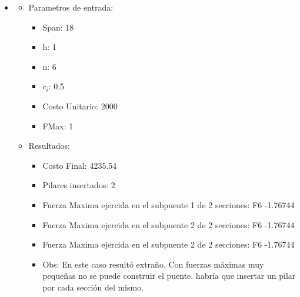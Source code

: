 \begin{itemize}
\begin{itemize}
\begin{itemize}
	  \end{itemize}
      \end{itemize}
\item
  \begin{itemize}
    \item Parametros de entrada:
	  \begin{itemize}
	    \item Span: 18
	    \item h: 1
	    \item n: 6
	    \item $c_i$: 0.5
	    \item Costo Unitario: 2000
	    \item FMax: 1
	  \end{itemize}
      \item Resultados:
	  \begin{itemize}
	    \item Costo Final: 4235.54
	    \item Pilares insertados: 2
	    \item Fuerza Maxima ejercida en el subpuente 1 de 2 secciones: F6 -1.76744
	    \item Fuerza Maxima ejercida en el subpuente 2 de 2 secciones: F6 -1.76744
	    \item Fuerza Maxima ejercida en el subpuente 2 de 2 secciones: F6 -1.76744
	    \item Obs: En este caso result\'o extraño. Con fuerzas m\'aximas muy pequeñas no se puede construir el puente. habr\'ia que insertar un pilar
por cada secci\'on del mismo.
	  \end{itemize}
      \end{itemize}

\end{itemize}
